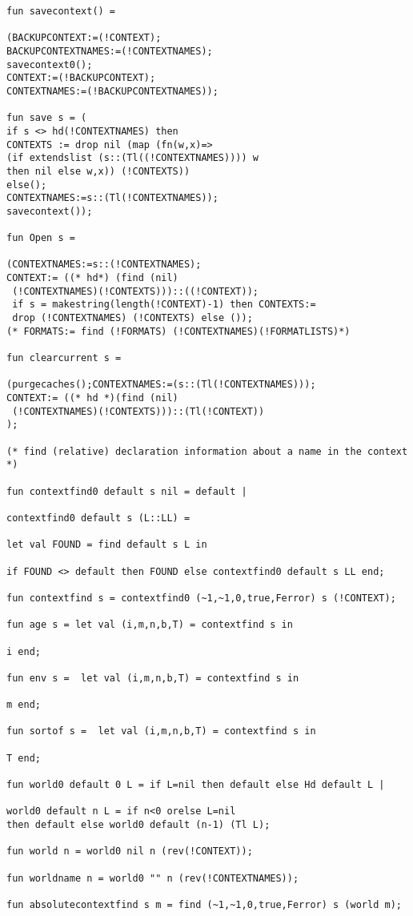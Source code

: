 \documentclass[12pt]{article}
\begin{document}
\begin{verbatim}
fun savecontext() =

(BACKUPCONTEXT:=(!CONTEXT);
BACKUPCONTEXTNAMES:=(!CONTEXTNAMES);
savecontext0();
CONTEXT:=(!BACKUPCONTEXT);
CONTEXTNAMES:=(!BACKUPCONTEXTNAMES));

fun save s = (
if s <> hd(!CONTEXTNAMES) then
CONTEXTS := drop nil (map (fn(w,x)=>
(if extendslist (s::(Tl((!CONTEXTNAMES)))) w 
then nil else w,x)) (!CONTEXTS))
else();
CONTEXTNAMES:=s::(Tl(!CONTEXTNAMES));
savecontext());

fun Open s =

(CONTEXTNAMES:=s::(!CONTEXTNAMES);
CONTEXT:= ((* hd*) (find (nil)
 (!CONTEXTNAMES)(!CONTEXTS)))::((!CONTEXT));
 if s = makestring(length(!CONTEXT)-1) then CONTEXTS:=
 drop (!CONTEXTNAMES) (!CONTEXTS) else ());
(* FORMATS:= find (!FORMATS) (!CONTEXTNAMES)(!FORMATLISTS)*) 

fun clearcurrent s =

(purgecaches();CONTEXTNAMES:=(s::(Tl(!CONTEXTNAMES)));
CONTEXT:= ((* hd *)(find (nil)
 (!CONTEXTNAMES)(!CONTEXTS)))::(Tl(!CONTEXT))
);

(* find (relative) declaration information about a name in the context *)

fun contextfind0 default s nil = default |

contextfind0 default s (L::LL) = 

let val FOUND = find default s L in

if FOUND <> default then FOUND else contextfind0 default s LL end;

fun contextfind s = contextfind0 (~1,~1,0,true,Ferror) s (!CONTEXT);

fun age s = let val (i,m,n,b,T) = contextfind s in

i end;

fun env s =  let val (i,m,n,b,T) = contextfind s in

m end;

fun sortof s =  let val (i,m,n,b,T) = contextfind s in

T end;

fun world0 default 0 L = if L=nil then default else Hd default L |

world0 default n L = if n<0 orelse L=nil 
then default else world0 default (n-1) (Tl L);

fun world n = world0 nil n (rev(!CONTEXT));

fun worldname n = world0 "" n (rev(!CONTEXTNAMES));

fun absolutecontextfind s m = find (~1,~1,0,true,Ferror) s (world m);


\end{verbatim}
\end{document}
